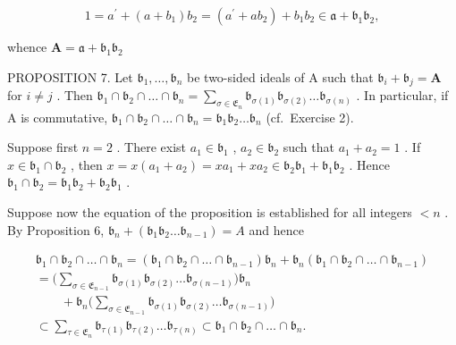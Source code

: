 \[
1 = a ^ {\prime} + (a + b _ {1}) b _ {2} = \left(a ^ {\prime} + a b _ {2}\right) + b _ {1} b _ {2} \in \mathfrak {a} + \mathfrak {b} _ {1} \mathfrak {b} _ {2},
\]

whence \(\mathbf{A} = \mathfrak{a} + \mathfrak{b}_1\mathfrak{b}_2\)

PROPOSITION 7. Let \(\mathfrak{b}_1, \ldots, \mathfrak{b}_n\) be two-sided ideals of A such that \(\mathfrak{b}_i + \mathfrak{b}_j = \mathbf{A}\) for \(i \neq j\) . Then \(\mathfrak{b}_1 \cap \mathfrak{b}_2 \cap \dots \cap \mathfrak{b}_n = \sum_{\sigma \in \mathfrak{E}_n} \mathfrak{b}_{\sigma(1)} \mathfrak{b}_{\sigma(2)} \ldots \mathfrak{b}_{\sigma(n)}\) . In particular, if A is commutative, \(\mathfrak{b}_1 \cap \mathfrak{b}_2 \cap \dots \cap \mathfrak{b}_n = \mathfrak{b}_1 \mathfrak{b}_2 \ldots \mathfrak{b}_n\) (cf.~Exercise 2).

Suppose first \(n = 2\) . There exist \(a_1 \in \mathfrak{b}_1\) , \(a_2 \in \mathfrak{b}_2\) such that \(a_1 + a_2 = 1\) . If \(x \in \mathfrak{b}_1 \cap \mathfrak{b}_2\) , then \(x = x(a_1 + a_2) = xa_1 + xa_2 \in \mathfrak{b}_2\mathfrak{b}_1 + \mathfrak{b}_1\mathfrak{b}_2\) . Hence \(\mathfrak{b}_1 \cap \mathfrak{b}_2 = \mathfrak{b}_1\mathfrak{b}_2 + \mathfrak{b}_2\mathfrak{b}_1\) .

Suppose now the equation of the proposition is established for all integers \(<n\) . By Proposition 6, \(\mathfrak{b}_{n} + (\mathfrak{b}_{1}\mathfrak{b}_{2}\ldots \mathfrak{b}_{n - 1}) = A\) and hence

\[
\begin{array}{l} \mathfrak {b} _ {1} \cap \mathfrak {b} _ {2} \cap \dots \cap \mathfrak {b} _ {n} = (\mathfrak {b} _ {1} \cap \mathfrak {b} _ {2} \cap \dots \cap \mathfrak {b} _ {n - 1}) \mathfrak {b} _ {n} + \mathfrak {b} _ {n} (\mathfrak {b} _ {1} \cap \mathfrak {b} _ {2} \cap \dots \cap \mathfrak {b} _ {n - 1}) \\ = \Big (\sum_ {\sigma \in \mathfrak {E} _ {n - 1}} \mathfrak {b} _ {\sigma (1)} \mathfrak {b} _ {\sigma (2)} \dots \mathfrak {b} _ {\sigma (n - 1)} \Big) \mathfrak {b} _ {n} \\ \qquad + \mathfrak {b} _ {n} \Big (\sum_ {\sigma \in \mathfrak {E} _ {n - 1}} \mathfrak {b} _ {\sigma (1)} \mathfrak {b} _ {\sigma (2)} \dots \mathfrak {b} _ {\sigma (n - 1)} \Big) \\ \subset \sum_ {\tau \in \mathfrak {E} _ {n}} \mathfrak {b} _ {\tau (1)} \mathfrak {b} _ {\tau (2)} \dots \mathfrak {b} _ {\tau (n)} \subset \mathfrak {b} _ {1} \cap \mathfrak {b} _ {2} \cap \dots \cap \mathfrak {b} _ {n}. \end{array}
\]

